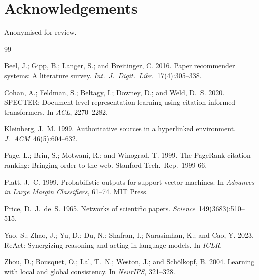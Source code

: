 \documentclass[letterpaper]{article}
\theoremstyle{plain}
\theoremstyle{definition}
\theoremstyle{remark}
\begin{document}
\section*{Acknowledgements}
Anonymised for review.


\begin{thebibliography}{99}

Beel, J.; Gipp, B.; Langer, S.; and Breitinger, C.
2016.
Paper recommender systems: A literature survey.
\emph{Int.\ J.\ Digit.\ Libr.}\ 17(4):305--338.

Cohan, A.; Feldman, S.; Beltagy, I.; Downey, D.; and Weld, D.~S.
2020.
SPECTER: Document-level representation learning using
citation-informed transformers.
In \emph{ACL}, 2270--2282.

Kleinberg, J.~M.
1999.
Authoritative sources in a hyperlinked environment.
\emph{J.\ ACM}\ 46(5):604--632.

Page, L.; Brin, S.; Motwani, R.; and Winograd, T.
1999.
The PageRank citation ranking: Bringing order to the web.
Stanford Tech.\ Rep.\ 1999-66.

Platt, J.~C.
1999.
Probabilistic outputs for support vector machines.
In \emph{Advances in Large Margin Classifiers},
61--74. MIT Press.

Price, D.~J.\ de~S.
1965.
Networks of scientific papers.
\emph{Science}\ 149(3683):510--515.

Yao, S.; Zhao, J.; Yu, D.; Du, N.; Shafran, I.;
Narasimhan, K.; and Cao, Y.
2023.
ReAct: Synergizing reasoning and acting in language models.
In \emph{ICLR}.

Zhou, D.; Bousquet, O.; Lal, T.~N.; Weston, J.;
and Sch\"{o}lkopf, B.
2004.
Learning with local and global consistency.
In \emph{NeurIPS}, 321--328.

\end{thebibliography}
\end{document}
